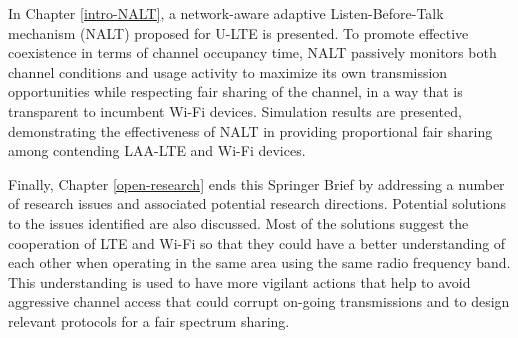 In Chapter \ref{intro-NALT}, a network-aware adaptive Listen-Before-Talk mechanism (NALT) proposed for U-LTE is presented. To promote effective coexistence in terms of channel occupancy time, NALT passively monitors both channel conditions and usage activity to maximize its own transmission opportunities while respecting fair sharing of the channel, in a way that is transparent to incumbent Wi-Fi devices. Simulation results are presented, demonstrating the effectiveness of NALT in providing proportional fair sharing among contending LAA-LTE and Wi-Fi devices.

Finally, Chapter \ref{open-research} ends this Springer Brief by addressing a number of research issues and associated potential research directions. Potential solutions to the issues identified are also discussed. Most of the solutions suggest the cooperation of LTE and Wi-Fi so that they could have a better understanding of each other when operating in the same area using the same radio frequency band. This understanding is used to have more vigilant actions that help to avoid aggressive channel access that could corrupt on-going transmissions and to design relevant protocols for a fair spectrum sharing.



